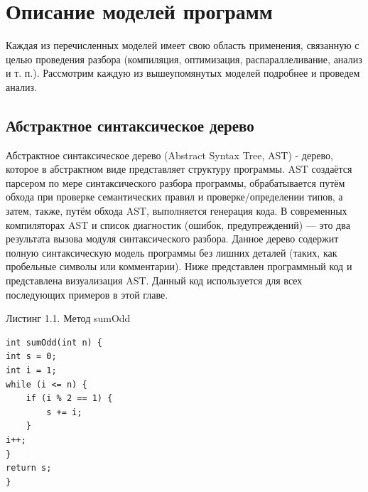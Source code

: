\section{Описание моделей программ} \label{ch1:sec2}
Каждая из перечисленных моделей имеет свою область применения, связанную с целью проведения разбора (компиляция, оптимизация, распараллеливание, анализ и т. п.). Рассмотрим каждую из вышеупомянутых моделей подробнее и проведем анализ.
\subsection{Абстрактное синтаксическое дерево} \label{ch1:subsec-title-abbr}
Абстрактное синтаксическое дерево (Abstract Syntax Tree, AST) - дерево, которое в абстрактном виде представляет структуру программы. AST создаётся парсером по мере синтаксического разбора программы, обрабатывается путём обхода при проверке семантических правил и проверке/определении типов, а затем, также, путём обхода AST, выполняется генерация кода. В современных компиляторах AST и список диагностик (ошибок, предупреждений) — это два результата вызова модуля синтаксического разбора.
Данное дерево содержит полную синтаксическую модель программы без лишних деталей (таких, как пробельные символы или комментарии). Ниже представлен программный код и представлена визуализация AST. Данный код используется для всех последующих примеров в этой главе.

\lstset{
numbersep = 5pt,
stepnumber = 1
}

\begin{flushright}
Листинг 1.1. Метод sumOdd
\end{flushright}

\begin{lstlisting}
int sumOdd(int n) {
int s = 0;
int i = 1;
while (i <= n) {
	if (i % 2 == 1) {
		s += i;
	}
i++;
}
return s;
}
\end{lstlisting}


